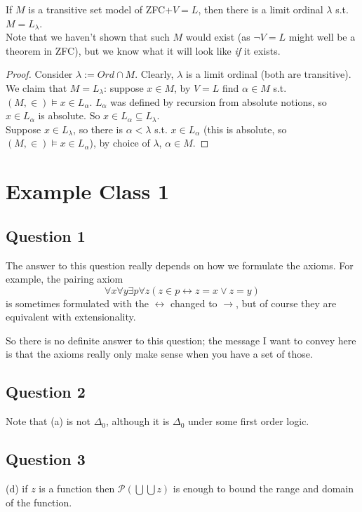 \documentclass[a4paper]{article}
\begin{document}
\begin{lemma}
If $M$ is a transitive set model of ZFC+$V=L$, then there is a limit ordinal $\lambda$ s.t. $M=L_\lambda$.\\
Note that we haven't shown that such $M$ would exist (as $\neg V=L$ might well be a theorem in ZFC), but we know what it will look like \emph{if} it exists.
\begin{proof}
Consider $\lambda:= Ord \cap M$. Clearly, $\lambda$ is a limit ordinal (both are transitive).\\
We claim that $M=L_\lambda$: suppose $x \in M$, by $V=L$ find $\alpha \in M$ s.t. $(M,\in) \vDash x \in L_\alpha$. $L_\alpha$ was defined by recursion from absolute notions, so $x \in L_\alpha$ is absolute. So $x \in L_\alpha \subseteq L_\lambda$.\\
Suppose $x \in L_\lambda$, so there is $\alpha < \lambda$ s.t. $x \in L_\alpha$ (this is absolute, so $(M,\in) \vDash x \in L_\alpha$), by choice of $\lambda$, $\alpha \in M$.
\end{proof}
\end{lemma}

\newpage

\section{Example Class 1}

\subsection{Question 1}

The answer to this question really depends on how we formulate the axioms. For example, the pairing axiom
\[
    \forall x \forall y \exists p \forall z (z \in p \leftrightarrow z = x \vee z = y)
\]
is sometimes formulated with the $\leftrightarrow$ changed to $\to$, but of course they are equivalent with extensionality.

So there is no definite answer to this question; the message I want to convey here is that the axioms really only make sense when you have a set of those.

\subsection{Question 2}
Note that (a) is not $\Delta_0$, although it is $\Delta_0$ under some first order logic.

\subsection{Question 3}
(d) if $z$ is a function then $\mathcal{P}(\bigcup\bigcup z)$ is enough to bound the range and domain of the function.
\end{document}
